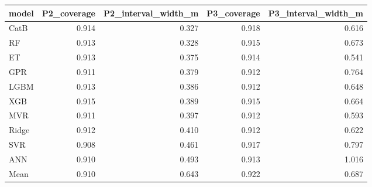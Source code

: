 \begin{tabular}{lrrrr}
\toprule
model & P2\_coverage & P2\_interval\_width\_m & P3\_coverage & P3\_interval\_width\_m \\
\midrule
CatB & 0.914 & 0.327 & 0.918 & 0.616 \\
RF & 0.913 & 0.328 & 0.915 & 0.673 \\
ET & 0.913 & 0.375 & 0.914 & 0.541 \\
GPR & 0.911 & 0.379 & 0.912 & 0.764 \\
LGBM & 0.913 & 0.386 & 0.912 & 0.648 \\
XGB & 0.915 & 0.389 & 0.915 & 0.664 \\
MVR & 0.911 & 0.397 & 0.912 & 0.593 \\
Ridge & 0.912 & 0.410 & 0.912 & 0.622 \\
SVR & 0.908 & 0.461 & 0.917 & 0.797 \\
ANN & 0.910 & 0.493 & 0.913 & 1.016 \\
Mean & 0.910 & 0.643 & 0.922 & 0.687 \\
\bottomrule
\end{tabular}
